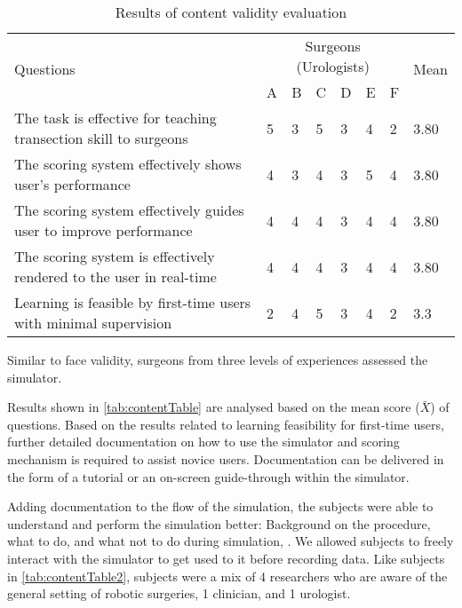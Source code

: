 \begin{table}
\small
\centering
\begin{tabular}{p{6cm}p{0.5cm}p{0.5cm}p{0.5cm}p{0.5cm}p{0.5cm}p{0.5cm}p{0.8cm}}
  \multirow{2}{4em}{Questions} & \multicolumn{6}{c}{Surgeons (Urologists)} & \multirow{2}{4em}{Mean}\\
  \cmidrule{2-7}
  & A & B & C & D & E & F &\\
  \toprule
  The task is effective for teaching transection skill to surgeons
  & 5& 3& 5& 3 & 4& 2 & 3.80\\
  \midrule
   The scoring system effectively shows user's performance
  & 4& 3& 4 & 3 & 5 & 4 & 3.80\\
  \midrule
   The scoring system effectively guides user to improve performance
  & 4 & 4 & 4& 3& 4 & 4 & 3.80\\
  \midrule
  The scoring system is effectively rendered to the user in real-time
  & 4 & 4 & 4& 3& 4 & 4 & 3.80\\
  \midrule
  Learning is feasible by first-time users with minimal supervision & 2 & 4 & 5 & 3 & 4& 2 & 3.3\\
  \bottomrule
\end{tabular}
\caption{Results of content validity evaluation}\label{tab:contentTable}
\end{table}

Similar to face validity, surgeons from three levels of experiences assessed the simulator.

Results shown in \autoref{tab:contentTable} are analysed based on the mean score ($\bar{X}$) of questions. Based on the results related to learning feasibility for first-time users, further detailed documentation on how to use the simulator and scoring mechanism is required to assist novice users. Documentation can be delivered in the form of a tutorial or an on-screen guide-through within the simulator.

Adding documentation to the flow of the simulation, the subjects were able to understand and perform the simulation better: Background on the  procedure, what to do, and what not to do during simulation, \etc. We allowed subjects to freely interact with the simulator to get used to it before recording data. Like subjects in \autoref{tab:contentTable2}, subjects were a mix of 4 researchers who are aware of the general setting of robotic surgeries, 1 clinician, and 1 urologist.

